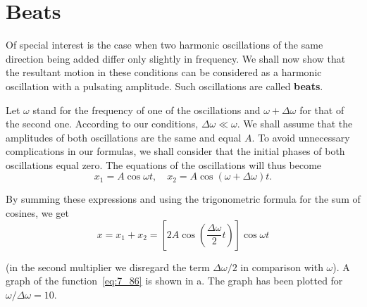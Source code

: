 \section{Beats}\label{sec:7_8}

Of special interest is the case when two harmonic oscillations of the same direction being added differ only slightly in frequency. We shall now show that the resultant motion in these conditions can be considered as a harmonic oscillation with a pulsating amplitude. Such oscillations are called \textbf{beats}.

Let $\omega$ stand for the frequency of one of the oscillations and $\omega+\Delta\omega$ for that of the second one. According to our conditions, $\Delta\omega\ll\omega$. We shall assume that the amplitudes of both oscillations are the same and equal $A$. To avoid unnecessary complications in our formulas, we shall consider that the initial phases of both oscillations equal zero. The equations of the oscillations will thus become
\begin{equation*}
	x_1 = A\cos\omega t,\quad x_2 = A\cos(\omega+\Delta\omega) t.
\end{equation*}

\noindent
By summing these expressions and using the trigonometric formula for the sum of cosines, we get
\begin{equation}\label{eq:7_86}
	x = x_1 + x_2 = \left[ 2A \cos\left(\frac{\Delta\omega}{2}t\right)\right] \cos\omega t
\end{equation}

\noindent
(in the second multiplier we disregard the term $\Delta\omega/2$ in comparison with $\omega$). A graph of the function~\eqref{eq:7_86} is shown in a. The graph has been plotted for $\omega/\Delta\omega=10$.

